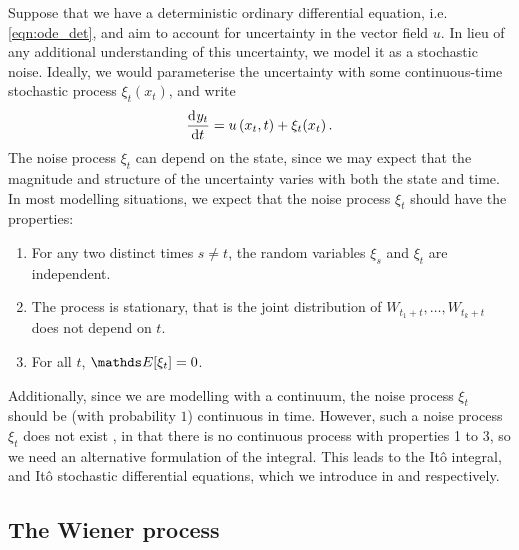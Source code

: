 Suppose that we have a deterministic ordinary differential equation, i.e. \cref{eqn:ode_det}, and aim to account for uncertainty in the vector field \(u\).
In lieu of any additional understanding of this uncertainty, we model it as a stochastic noise.
Ideally, we would parameterise the uncertainty with some continuous-time stochastic process \(\xi_t\!\left(x_t\right)\), and write
\[
	\dod{y_t}{t} = u\left(x_t, t\right) + \xi_t\!\left(x_t\right).
\]
The noise process \(\xi_t\) can depend on the state, since we may expect that the magnitude and structure of the uncertainty varies with both the state and time.
In most modelling situations, we expect that the noise process \(\xi_t\) should have the properties:
\begin{enumerate}
	\item For any two distinct times \(s \neq t\), the random variables \(\xi_s\) and \(\xi_t\) are independent.
	\item The process is stationary, that is the joint distribution of \(W_{t_1 + t}, \dotsc, W_{t_k + t}\) does not depend on \(t\).
	\item For all \(t\), \(\avg{\xi_t} = 0\).
\end{enumerate}
Additionally, since we are modelling with a continuum, the noise process \(\xi_t\) should be (with probability \(1\)) continuous in time.
However, such a noise process \(\xi_t\) does not exist \citep{Oksendal_2003_StochasticDifferentialEquations}, in that there is no  continuous process with properties 1 to 3, so we need an alternative formulation of the integral.
This leads to the It\^o integral, and It\^o stochastic differential equations, which we introduce in  and  respectively.



\subsection{The Wiener process}


